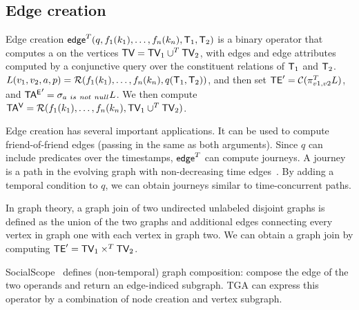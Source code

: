 \subsection{Edge creation}
\label{sec:algebra:ecreate}

Edge creation
$\textsf{edge}^T(q,f_1(k_1),\ldots,f_n(k_n),\mathsf{T}_1,\mathsf{T}_2)$ is a binary
operator that computes a \tg on the vertices $\textsf{TV} = \textsf{TV}_1 \cup^T
\textsf{TV}_2$, with edges and edge attributes computed by a conjunctive query
over the constituent relations of $\mathsf{T}_1$ and $\mathsf{T}_2$.  
$L(v_1,v_2,a,p) = \mathcal{R}(f_1(k_1),\ldots,f_n(k_n),q(\mathsf{T}_1,
  \mathsf{T}_2))$, and then set $\textsf{TE}' = \mathcal{C}(\pi^T_{v1,v2} L)$, and $\mathsf{TA^{E}}'
= \sigma_{a~is~not~null} L$.  We then compute $\mathsf{TA^{V}} =
\mathcal{R}(f_1(k_1),\ldots,f_n(k_n),\textsf{TV}_1 \cup^T \textsf{TV}_2)$.


Edge creation has several important applications.  It can be used to
compute friend-of-friend edges (passing in the same \tg as both
arguments).  Since $q$ can include predicates over the timestamps,
$\textsf{edge}^T$ can compute journeys.  A journey is a path in the
evolving graph with non-decreasing time
edges~\cite{Casteigts2011,Ferreira2004}.  By adding a temporal
condition to $q$, we can obtain journeys similar to time-concurrent
paths.

In graph theory, a graph join of two undirected unlabeled disjoint
graphs is defined as the union of the two graphs and additional edges
connecting every vertex in graph one with each vertex in graph two.
We can obtain a graph join by computing $\textsf{TE}' = \textsf{TV}_1 \times^T \textsf{TV}_2$.

SocialScope~\cite{Amer-Yahia2009} defines (non-temporal) graph
composition: compose the edge of the two operands and return an
edge-indiced subgraph.  TGA can express this operator by a combination
of node creation and vertex subgraph.


